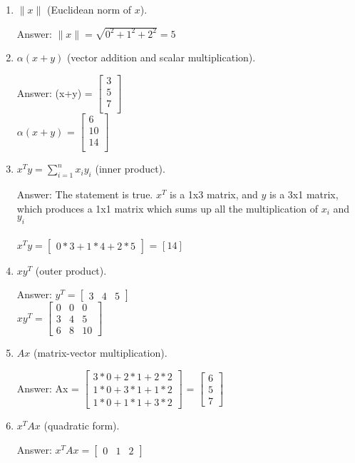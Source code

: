 \documentclass{article}
\def\ans#1{\par\gre{Answer: #1}}
\def\gre#1{{\color{gre}#1}}
\def\norm#1{\|#1\|}
\def\enum#1{\begin{enumerate}#1\end{enumerate}}
\begin{document}
\enum{
\item $\norm{x}$ (Euclidean norm of $x$).
\ans{
$\norm{x} = \sqrt{0^2+1^2+2^2} = 5$
}
\item $\alpha(x+y)$ (vector addition and scalar multiplication).
\ans{
(x+y) =  $\left[\begin{array}{c}
3\\
5\\
7\\
\end{array}\right]$ \\
$\alpha(x+y)$ =  $\left[\begin{array}{c}
6\\
10\\
14\\
\end{array}\right]$
}
\item $x^Ty = \sum_{i=1}^n x_iy_i$ (inner product).
\ans{
The statement is true. $x^T$ is a 1x3 matrix, and $y$ is a 3x1 matrix, which produces a 1x1 matrix which sums up all the multiplication of $x_i$ and $y_i$ \\\\
$x^Ty = \left[\begin{array}{ccc}
0*3+1*4+2*5
\end{array}\right]$  = $\left[14\right]$
}
\item $xy^T$ (outer product).
\ans{
$y^T = \left[\begin{array}{ccc}
3 & 4 & 5
\end{array}\right]$ \\
$ xy^T  = \left[\begin{array}{ccc}
0 & 0 & 0\\
3 & 4 & 5\\
6 & 8 & 10
\end{array}\right]$
}
\item $Ax$ (matrix-vector multiplication).
\ans{
Ax = $\left[\begin{array}{c}
3*0 + 2*1 + 2*2\\
1*0 + 3*1 + 1*2\\
1*0 + 1*1 + 3*2
\end{array}\right]$
= $\left[\begin{array}{c}
6\\
5\\
7
\end{array}\right]$
}
\item $x^TAx$ (quadratic form).
\ans{
$x^TAx = \left[\begin{array}{ccc}
0 & 1 & 2
\end{array}\right]$ 
}}
\end{document}
